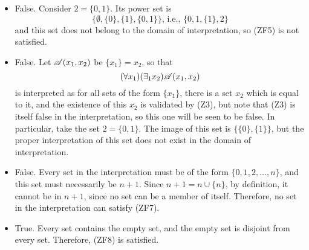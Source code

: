 \begin{enumerate}
\begin{itemize}
      \item False. Consider \(2 = \{0, 1\}\). Its power set is
        \[\{\emptyset, \{0\}, \{1\}, \{0, 1\}\} \text{, i.e., } \{0, 1, \{1\}, 2\}\]
        and this set does not belong to the domain of interpretation, so (ZF5) is not satisfied.

      \item False. Let \(\mathscr{A}(x_1, x_2)\) be \(\{x_1\} = x_2\), so that
        \[(\forall x_1)(\exists_1 x_2) \mathscr{A}(x_1, x_2)\]
        is interpreted as for all sets of the form \(\{x_1\}\), there is a set \(x_2\) which is equal to it, and the existence of this \(x_2\) is validated by (Z3), but note that (Z3) is itself false in the interpretation, so this one will be seen to be false. In particular, take the set \(2 = \{0, 1\}\). The image of this set is \(\{\{0\}, \{1\}\}\), but the proper interpretation of this set does not exist in the domain of interpretation.

      \item False. Every set in the interpretation must be of the form \(\{0, 1, 2, \dots, n\}\), and this set must necessarily be \(n + 1\). Since \(n + 1 = n \cup \{n\}\), by definition, it cannot be in \(n + 1\), since no set can be a member of itself. Therefore, no set in the interpretation can satisfy (ZF7).

      \item True. Every set contains the empty set, and the empty set is disjoint from every set. Therefore, (ZF8) is satisfied.
    \end{itemize}
\end{enumerate}
